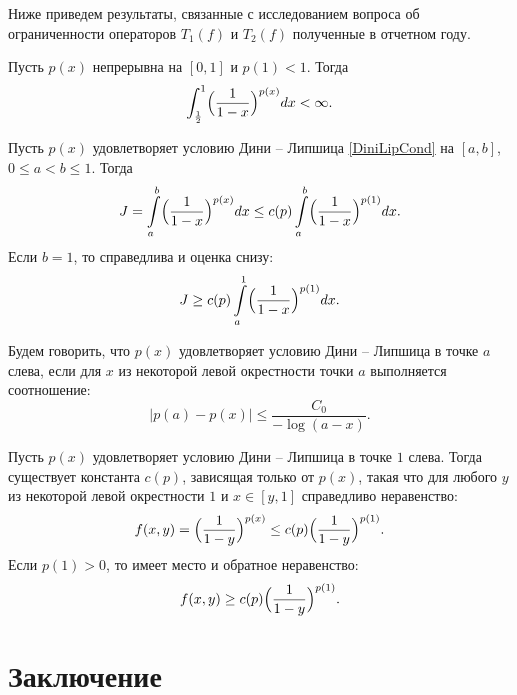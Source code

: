 Ниже приведем результаты, связанные с исследованием вопроса об ограниченности операторов $T_1(f)$ и $T_2(f)$ полученные в отчетном году.
\begin{lemma}\label{st-Int1-x-p4-bounded}
Пусть $p(x)$ непрерывна на $[0,1]$ и $p(1)<1$. Тогда
\begin{equation}\label{int-of-1-x-qrtr-exp}
  \int_{\frac12}^1\Bigl(\frac1{1-x}\Bigr)^{p(x)}dx<\infty.
\end{equation}
\end{lemma}

\begin{lemma}\label{est-px-p1}
Пусть $p(x)$ удовлетворяет условию Дини -- Липшица \eqref{DiniLipCond} на $[a,b]$, $0 \le a < b \le 1$. Тогда
\begin{equation}
J=\int\limits_{a}^{b} \Bigl( \frac{1}{1-x} \Bigr)^{p(x)}dx \le
c(p) \int\limits_{a}^{b} \Bigl( \frac{1}{1-x} \Bigr)^{p(1)}dx.
\end{equation}
Если $b=1$, то справедлива и оценка снизу:
\begin{equation}
J \ge
c(p) \int\limits_{a}^{1} \Bigl( \frac{1}{1-x} \Bigr)^{p(1)}dx.
\end{equation}
\end{lemma}
\begin{definition}
Будем говорить, что $p(x)$ удовлетворяет условию Дини -- Липшица в точке $a$ слева, если для $x$ из некоторой левой окрестности точки $a$ выполняется соотношение:
\begin{equation}\label{DL-at-point}
|p(a)-p(x)| \le \frac{C_0}{-\log(a-x)}.
\end{equation}
\end{definition}

\begin{lemma}\label{st-px-p1-func}
Пусть $p(x)$ удовлетворяет условию Дини -- Липшица в точке $1$ слева. Тогда существует константа $c(p)$, зависящая только от $p(x)$, такая что для любого $y$ из некоторой левой окрестности $1$ и $x \in [y,1]$ справедливо неравенство:
\begin{equation}
f(x,y)=\Bigl(\frac{1}{1-y}\Bigr)^{p(x)} \le c(p)\Bigl(\frac{1}{1-y}\Bigr)^{p(1)}.
\end{equation}
Если $p(1)>0$, то имеет место и обратное неравенство:
\begin{equation}
f(x,y) \ge c(p)\Bigl(\frac{1}{1-y}\Bigr)^{p(1)}.
\end{equation}
\end{lemma}


\section*{Заключение}

